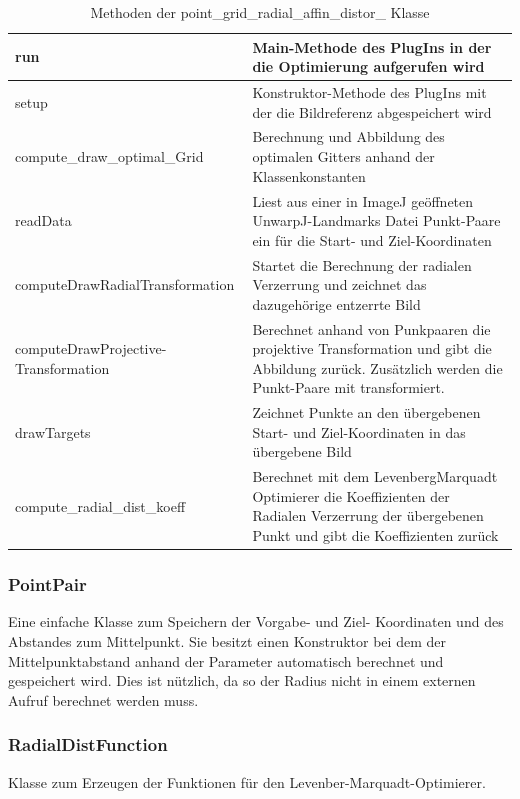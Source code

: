 \begin{table}[H]
	\begin{tabular}{|p{} | p{}|} 
		\hline
		run & Main-Methode des PlugIns in der die Optimierung aufgerufen wird\\ \hline
		setup & Konstruktor-Methode des PlugIns mit der die Bildreferenz abgespeichert wird\\ \hline
		compute\_draw\_optimal\_Grid & Berechnung und Abbildung des optimalen Gitters anhand der Klassenkonstanten \\ \hline
		readData & Liest aus einer in ImageJ geöffneten UnwarpJ-Landmarks Datei Punkt-Paare ein für die Start- und Ziel-Koordinaten\\\hline
		computeDrawRadialTransformation & Startet die Berechnung der radialen Verzerrung und zeichnet das dazugehörige entzerrte Bild\\ \hline
		computeDrawProjective-Transformation & Berechnet anhand von Punkpaaren die projektive Transformation und gibt die Abbildung zurück. Zusätzlich werden die Punkt-Paare mit transformiert.\\ \hline
		drawTargets & Zeichnet Punkte an den übergebenen Start- und Ziel-Koordinaten in das übergebene Bild\\ \hline
		compute\_radial\_dist\_koeff & Berechnet mit dem LevenbergMarquadt Optimierer die Koeffizienten der Radialen Verzerrung der übergebenen Punkt und gibt die Koeffizienten zurück\\ 
		\hline
	\end{tabular}
	\caption{Methoden der point\_grid\_radial\_affin\_distor\_ Klasse}
\end{table}

\subsubsection{PointPair}
Eine einfache Klasse zum Speichern der Vorgabe- und Ziel- Koordinaten und des Abstandes zum Mittelpunkt. Sie besitzt einen Konstruktor bei dem der Mittelpunktabstand anhand der Parameter automatisch berechnet und gespeichert wird. Dies ist nützlich, da so der Radius nicht in einem externen Aufruf berechnet werden muss.

\subsubsection{RadialDistFunction}
Klasse zum Erzeugen der Funktionen für den Levenber-Marquadt-Optimierer.

